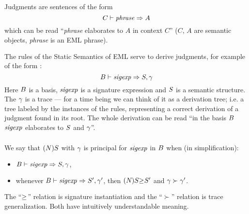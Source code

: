 \subsubsection{\secsemantic}
\label{sec:semantic}

\subsubsection{\secjudgments}
\label{sec:judgments}
{
Judgments are sentences of the form
\[C\ts{\it phrase}\ra A\]
which can be read ``{\it phrase} elaborates to $A$ in context $C$''
($C$, $A$ are semantic objects, {\it phrase} is an EML phrase).

The rules of the Static Semantics of EML serve to derive judgments, for example
of the form :
$$\B\ts\sigexp\ra\S,\trace$$
Here $\B$ is a basis, $\sigexp$ is a signature expression and $\S$ is a semantic structure.
The $\trace$ is a trace --- for a time being we can think of it as a derivation tree;
i.e. a tree labeled by the instances of the rules, representing a correct derivation
of a judgment found in its root. The whole derivation can be read  
``in the basis $\B$ $\sigexp$ elaborates to $\S$ and $\trace$''.
}
{}

\subsubsection{\secprincipal}
\label{sec:principal}

{
We say that $(\N)\S$ with $\trace$ is principal for $\sigexp$ in $\B$
when (in simplification):
\begin{itemize}
\item $\B\vdash\sigexp\ra\S,\trace$,
\item whenever $\B\vdash\sigexp\ra\S',\trace'$, then
      $\sigord{\longsig{}}{}{\S'}$ and $\trace\succ\trace'$.
\end{itemize}
The ``$\sigord{}{}$'' relation is signature instantiation
and the ``$\succ$'' relation is trace generalization.
Both have intuitively understandable meaning.     
}
{}
\subsection{\secinterest}
\label{sec:interest}

